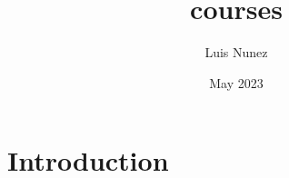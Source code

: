 \documentclass{article}
\title{courses}
\author{Luis Nunez}
\date{May 2023}
\begin{document}
\maketitle

\section{Introduction}
\end{document}
